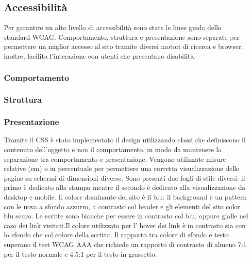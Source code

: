 \subsection{Accessibilità}
\label{sub:accessibilità}
Per garantire un alto livello di accessibilità sono state le linee guida dello standard WCAG. Comportamento, struttura e presentazione sono separate per permettere un miglior accesso al sito tramite diversi motori di ricerca e browser, inoltre, facilita l'interazione con utenti che presentano disabilità.
\subsubsection{Comportamento}

\subsubsection{Struttura}
\subsubsection{Presentazione}
Tramite il CSS è stato implementato il design utilizzando classi che definiscono il contenuto dell'oggetto e non il comportamento, in modo da mantenere la separazione tra comportamento e presentazione. Vengono utilizzate misure relative (em) o in percentuale per permettere una corretta visualizzazione delle pagine su schermi di dimensioni diverse. Sono presenti due fogli di stile diversi: il primo è dedicato alla stampa mentre il secondo è dedicato alla visualizzazione da dasktop e mobile.
Il colore dominante del sito è il blu: il background è un pattern con le uova a sfondo azzurro, a contrasto col header e gli elementi del sito color blu scuro. Le scritte sono bianche per essere in contrasto col blu, oppure gialle nel caso dei link visitati.Il colore utilizzato per l' hover dei link è in contrasto sia con lo sfondo che col colore della scritta. Il rapporto tra colore di sfondo e testo superano il test WCAG AAA che richiede un rapporto di contrasto di almeno 7:1 per il testo normale e 4.5:1 per il testo in grassetto.

